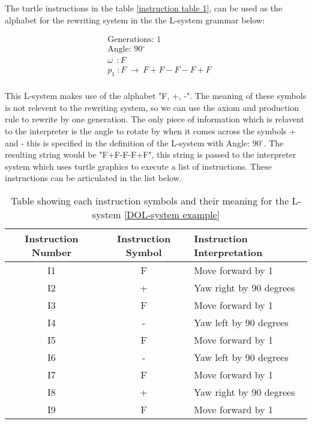 \begin{flushleft}
\vspace{5mm}

The turtle instructions in the table \ref{instruction table 1}, can be used as the alphabet for the rewriting system in the the L-system grammar below:

\begin{equation} \label{DOL-system example}
\begin{aligned}
	&\text{Generations: 1}\\
	&\text{Angle: 90$^{\circ}$}\\
	&\omega~~ : F \\
	&p_1~ :  F~ \rightarrow~ F+F-F-F+F\\
\end{aligned}
\end{equation}

\vspace{5mm}

This L-system makes use of the alphabet "F, +, -". The meaning of these symbols is not relevent to the rewriting system, so we can use the axiom and production rule to rewrite by one generation. The only piece of information which is relavent to the interpreter is the angle to rotate by when it comes across the symbols + and - this is specified in the definition of the L-system with Angle: 90$^{\circ}$. The resulting string would be "F+F-F-F+F", this string is passed to the interpreter system which uses turtle graphics to execute a list of instructions. These instructions can be articulated in the list below.

\vspace{5mm}

\begin{table}[h!]
\begin{tabular}{ | c | c | l | }
\hline
	 	Instruction Number & Instruction Symbol & Instruction Interpretation \\  
\hline
\hline
	I1 						& F & Move forward by 1\\
\hline
	I2						& + & Yaw right by 90 degrees\\
\hline
	I3						& F & Move forward by 1\\
\hline
	I4						& - & Yaw left by 90 degrees \\
\hline
	I5						& F & Move forward by 1\\
\hline
	I6 						& - & Yaw left by 90 degrees \\
\hline
	I7 						& F & Move forward by 1\\
\hline
	I8 						& + & Yaw right by 90 degrees\\
\hline
	I9 						& F & Move forward by 1\\
\hline
\end{tabular}
\caption{Table showing each instruction symbols and their meaning for the L-system \ref{DOL-system example}}
\label{Instruction Interpretation}
\end{table}
\FloatBarrier


\end{flushleft}
